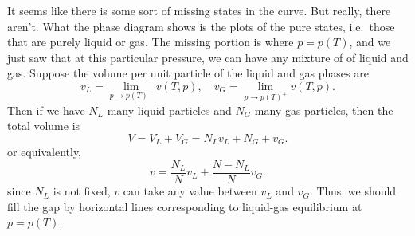 \documentclass[a4paper]{article}
\begin{document}
It seems like there is some sort of missing states in the curve. But really, there aren't. What the phase diagram shows is the plots of the pure states, i.e.\, those that are purely liquid or gas. The missing portion is where $p = p(T)$, and we just saw that at this particular pressure, we can have any mixture of of liquid and gas. Suppose the volume per unit particle of the liquid and gas phases are
\[
  v_L = \lim_{p \to p(T)^-} v(T, p),\quad v_G = \lim_{p \to p(T)^+} v(T, p).
\]
Then if we have $N_L$ many liquid particles and $N_G$ many gas particles, then the total volume is
\[
  V = V_L + V_G = N_L v_L + N_G + v_G.
\]
or equivalently,
\[
  v = \frac{N_L}{N} v_L + \frac{N - N_L}{N} v_G.
\]
since $N_L$ is not fixed, $v$ can take any value between $v_L$ and $v_G$. Thus, we should fill the gap by horizontal lines corresponding to liquid-gas equilibrium at $p = p(T)$.
\end{document}
